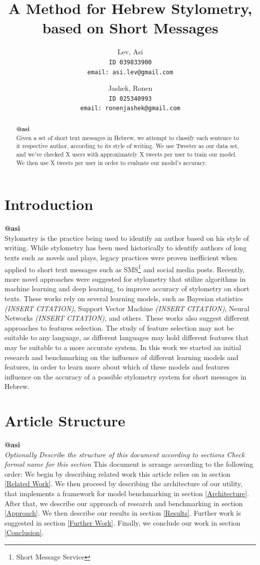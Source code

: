 \documentclass[a4paper]{article}
\author{Lev, Asi\\
	\texttt{ID 039833900}\\
	\texttt{email: asi.lev@gmail.com}
\and
	Jashek, Ronen\\
	\texttt{ID 025340993}\\
	\texttt{email: ronenjashek@gmail.com}	
}
\title{A Method for Hebrew Stylometry, based on Short Messages}
\date{}
\begin{document}
\maketitle
\begin{abstract}
\textbf{@asi}\\
Given a set of short text messages in Hebrew, we attempt to classify each sentence to it respective author, according to its style of writing.
We use Tweeter as our data set, and we've checked X users with approximately X tweets per user to train our model.
We then use X tweets per user in order to evaluate our model's accuracy.
\end{abstract}
\section{Introduction}
\textbf{@asi}\\
Stylometry is the practice being used to identify an author based on his style of writing.
While stylometry has been used historically to identify authors of long texts such as novels and plays, legacy practices were proven inefficient when applied to short text messages such as SMS\footnote{Short Message Service} and social media posts.
Recently, more novel approaches were suggested for stylometry that utilize algorithms in machine learning and deep learning, to improve accuracy of stylometry on short texts.
These works rely on several learning models, such as Bayesian statistics \emph{(INSERT CITATION)}, Support Vector Machine \emph{(INSERT CITATION)}, Neural Networks \emph{(INSERT CITATION)}, and others.
These works also suggest different approaches to features selection. The study of feature selection may not be suitable to any language, as different languages may hold different features that may be suitable to a more accurate system.
In this work we started an initial research and benchmarking on the influence of different learning models and features, in order to learn more about which of these models and features influence on the accuracy of a possible stylometry system for short messages in Hebrew.
\section{Article Structure}
\textbf{@asi}\\
\emph{Optionally
Describe the structure of this document according to sections
Check formal name for this section
}
This document is arrange according to the following order:
We begin by describing related work this article relies on in section \ref{Related Work}.
We then proceed by describing the architecture of our utility, that implements a framework for model benchmarking in section \ref{Architecture}.
After that, we describe our approach of research and benchmarking in section \ref{Approach}.
We then describe our results in section \ref{Results}.
Further work is suggested in section \ref{Further Work}.
Finally, we conclude our work in section \ref{Conclusion}.
\end{document}
